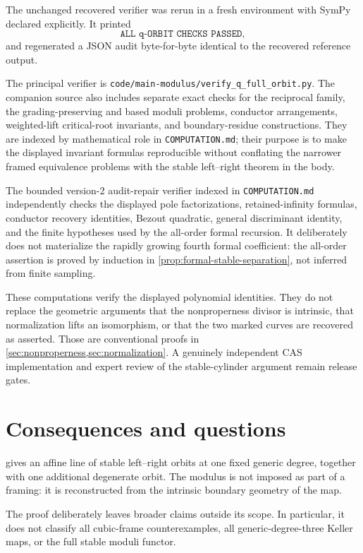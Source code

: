 \documentclass[11pt,reqno]{amsart}
\begin{document}
The unchanged recovered verifier was rerun in a fresh environment with SymPy
declared explicitly.  It printed
\[
\texttt{ALL q-ORBIT CHECKS PASSED},
\]
and regenerated a JSON audit byte-for-byte identical to the recovered
reference output.

The principal verifier is
\texttt{code/main-modulus/verify\_q\_full\_orbit.py}.  The companion source
also includes separate exact checks for the reciprocal family, the
grading-preserving and based moduli problems, conductor arrangements,
weighted-lift critical-root invariants, and boundary-residue constructions.
They are indexed by mathematical role in \texttt{COMPUTATION.md}; their
purpose is to make the displayed invariant formulas reproducible without
conflating the narrower framed equivalence problems with the stable
left--right theorem in the body.

The bounded version-2 audit-repair verifier indexed in
\texttt{COMPUTATION.md}
independently checks the displayed pole factorizations, retained-infinity
formulas, conductor recovery identities, Bezout quadratic, general
discriminant identity, and the finite hypotheses used by the all-order
formal recursion.  It deliberately does not materialize the rapidly growing
fourth formal coefficient: the all-order assertion is proved by induction in
\cref{prop:formal-stable-separation}, not inferred from finite sampling.

These computations verify the displayed polynomial identities.  They do not
replace the geometric arguments that the nonproperness divisor is intrinsic,
that normalization lifts an isomorphism, or that the two marked curves are
recovered as asserted.  Those are conventional proofs in
\cref{sec:nonproperness,sec:normalization}.  A genuinely independent CAS
implementation and expert review of the stable-cylinder argument remain
release gates.

\section{Consequences and questions}
\label{sec:questions}

 gives an affine line of stable left--right orbits at one fixed
generic degree, together with one additional degenerate orbit.  The modulus
is not imposed as part of a framing: it is reconstructed from the intrinsic
boundary geometry of the map.

The proof deliberately leaves broader claims outside its scope.  In
particular, it does not classify all cubic-frame counterexamples, all
generic-degree-three Keller maps, or the full stable moduli functor.
\end{document}
